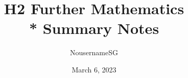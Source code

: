 
\title{H2 Further Mathematics \\* Summary Notes}
\author{NousernameSG}
\date{March 6, 2023}



\maketitle

\newpage \ \newpage \ \newpage

{\onecolumn \setcounter{tocdepth}{2} \tableofcontents} \newpage
\twocolumn

 \newpage
 \newpage
 \newpage
 \newpage
 \newpage
 \newpage
 \newpage


